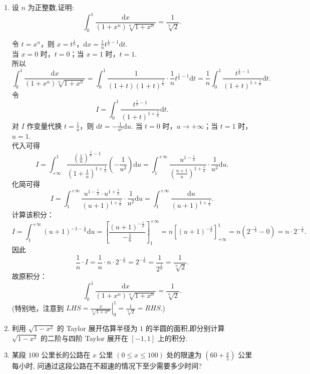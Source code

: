 \begin{enumerate}
    \item[5.]设 \(n\) 为正整数,证明:
    \[\displaystyle\int_{0}^{1}{\frac{\mathrm{d}x}{(1 + x^{n})\sqrt[n]{1 + x^{n}}}} = \frac{1}{\sqrt[n]{2}}.\]
    \begin{solution}
        令 $t = x^n$，则 $\displaystyle x = t^{\frac{1}{n}}$，$\displaystyle\mathrm{d}x = \frac{1}{n} t^{\frac{1}{n}-1} \mathrm{d}t$.\\  
        当 $x=0$ 时，$t=0$；当 $x=1$ 时，$t=1$.\\
        所以
        \[
        \int_0^1 \frac{\mathrm{d}x}{(1+x^n) \sqrt[n]{1+x^n}} = \int_0^1 \frac{1}{(1+t)(1+t)^{\frac{1}{n}}} \cdot \frac{1}{n} t^{\frac{1}{n} - 1} \mathrm{d}t = \frac{1}{n} \int_0^1 \frac{t^{\frac{1}{n}- 1}}{(1+t)^{1+\frac{1}{n}}} \mathrm{d}t.
        \]
        令
        \[
        I = \int_0^1 \frac{t^{\frac{1}{n}- 1}}{(1+t)^{1+\frac{1}{n}}} \mathrm{d}t.
        \]  
        对 $I$ 作变量代换 $\displaystyle t = \frac{1}{u}$，则 $\displaystyle\mathrm{d}t = -\frac{1}{u^2} \mathrm{d}u$. 当 $t=0$ 时，$u \to +\infty$；当 $t=1$ 时，$u=1$.\\
        代入可得
        \[
        I = \int_{+\infty}^1 \frac{(\frac{1}{u})^{\frac{1}{n} - 1}}{(1+\frac{1}{u})^{1+\frac{1}{n}}} \left(-\frac{1}{u^2}\right) \mathrm{d}u = \int_1^{+\infty} \frac{u^{1-\frac{1}{n}}}{(\frac{u+1}{u})^{1+\frac{1}{n}}} \cdot \frac{1}{u^2} \mathrm{d}u.
        \]
        化简可得
        \[
        I = \int_1^{+\infty} \frac{u^{1-\frac{1}{n}} \cdot u^{1+\frac{1}{n}}}{(u+1)^{1+\frac{1}{n}}} \cdot \frac{1}{u^2} \mathrm{d}u = \int_1^{+\infty} \frac{\mathrm{d}u}{(u+1)^{1+\frac{1}{n}}}.
        \]
        计算该积分：
        \[
        I = \int_1^{+\infty} (u+1)^{-1-\frac{1}{n}} \mathrm{d}u = \left[ \frac{(u+1)^{-\frac{1}{n}}}{-\frac{1}{n}} \right]_1^{+\infty} = n \left[ (u+1)^{-\frac{1}{n}} \right]_{+\infty}^1 = n \left( 2^{-\frac{1}{n}} - 0 \right) = n \cdot 2^{-\frac{1}{n}}.
        \]
        因此
        \[
        \frac{1}{n} \cdot I = \frac{1}{n} \cdot n \cdot 2^{-\frac{1}{n}} = 2^{-\frac{1}{n}} = \frac{1}{2^{\frac{1}{n}}} = \frac{1}{\sqrt[n]{2}}.
        \]
        故原积分：
        \[
        \int_0^1 \frac{\mathrm{d}x}{(1+x^n) \sqrt[n]{1+x^n}} = \frac{1}{\sqrt[n]{2}}.  
        \]
        (特别地，注意到 $\displaystyle LHS=\left.\frac{x}{\sqrt[n]{1+x^n}}\right|_0^1=\frac{1}{\sqrt[n]{2}}=RHS$.)
    \end{solution}

    \item[6.]利用 \(\sqrt{1 - x^{2}}\) 的 Taylor 展开估算半径为 $1$ 的半圆的面积,即分别计算 \(\displaystyle \sqrt{1 - x^{2}}\) 的二阶与四阶 Taylor 展开在 \([-1,1]\) 上的积分.
    \item[7.]某段 $100$ 公里长的公路在 \(x\) 公里 \(\displaystyle(0\leq x\leq 100)\) 处的限速为 \(\displaystyle(60 + \frac{x}{5})\) 公里每小时, 问通过这段公路在不超速的情况下至少需要多少时间?
\end{enumerate}

